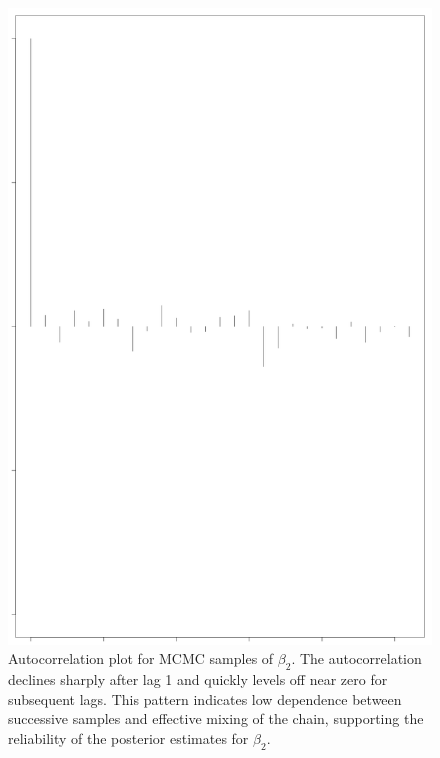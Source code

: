 \documentclass[]{article}
\begin{document}
\begin{figure}
	\centering
	\includegraphics[width=0.7\linewidth]{img/img-autocorr-beta2}
	\caption{Autocorrelation plot for MCMC samples of $\beta_2$. The autocorrelation declines sharply after lag 1 and quickly levels off near zero for subsequent lags. This pattern indicates low dependence between successive samples and effective mixing of the chain, supporting the reliability of the posterior estimates for $\beta_2$.}
	\label{fig:img-autocorr-beta2}
\end{figure}
\end{document}
